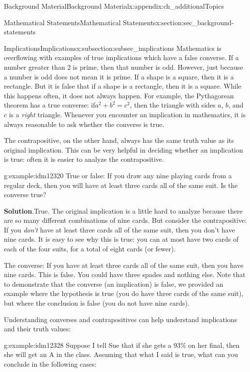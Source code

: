 \documentclass[oneside,10pt,]{book}
\numberwithin{equation}{chapter}
\begin{document}
\begin{appendixptx}{Background Material}{}{Background Material}{}{}{x:appendix:ch_additionalTopics}
\begin{sectionptx}{Mathematical Statements}{}{Mathematical Statements}{}{}{x:section:sec_background-statements}
\begin{subsectionptx}{Implications}{}{Implications}{}{}{x:subsection:subsec_implications}
Mathematics is overflowing with examples of true implications which have a false converse. If a number greater than 2 is prime, then that number is odd. However, just because a number is odd does not mean it is prime. If a shape is a square, then it is a rectangle. But it is false that if a shape is a rectangle, then it is a square. While this happens often, it does not always happen. For example, the Pythagorean theorem has a true converse: if\(a^2 + b^2 = c^2\), then the triangle with sides \(a\), \(b\), and \(c\) is a \emph{right} triangle. Whenever you encounter an implication in mathematics, it is always reasonable to ask whether the converse is true.%
\par
The contrapositive, on the other hand, always has the same truth value as its original implication. This can be very helpful in deciding whether an implication is true: often it is easier to analyze the contrapositive.%
\begin{example}{}{g:example:idm12320}%
True or false: If you draw any nine playing cards from a regular deck, then you will have at least three cards all of the same suit. Is the converse true?%
\par\smallskip%
\noindent\textbf{Solution}.\hypertarget{g:solution:idm12323}{}\quad{}True. The original implication is a little hard to analyze because there are so many different combinations of nine cards. But consider the contrapositive: If you \emph{don't} have at least three cards all of the same suit, then you don't have nine cards. It is easy to see why this is true: you can at most have two cards of each of the four suits, for a total of eight cards (or fewer).%
\par
The converse: If you have at least three cards all of the same suit, then you have nine cards. This is false. You could have three spades and nothing else. Note that to demonstrate that the converse (an implication) is false, we provided an example where the hypothesis is true (you do have three cards of the same suit), but where the conclusion is false (you do not have nine cards).%
\end{example}
Understanding converses and contrapositives can help understand implications and their truth values:%
\begin{example}{}{g:example:idm12328}%
Suppose I tell Sue that if she gets a 93\% on her final, then she will get an A in the class. Assuming that what I said is true, what can you conclude in the following cases:%
\par
%
\begin{enumerate}

\end{enumerate}
\end{example}
\end{subsectionptx}
\end{sectionptx}
\end{appendixptx}
\end{document}
